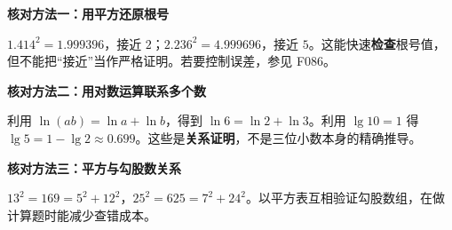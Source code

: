 \clearpage
\begin{proofbox}
\textbf{\textcolor{CProof}{核对方法一：用平方还原根号}}
\par\medskip
\begin{center}

\end{center}
\medskip
$1.414^2=1.999396$，接近 $2$；$2.236^2=4.999696$，接近 $5$。这能快速\textbf{检查}根号值，但不能把“接近”当作严格证明。若要控制误差，参见 F086。
\end{proofbox}
\clearpage
\begin{proofbox}
\textbf{\textcolor{CProof}{核对方法二：用对数运算联系多个数}}
\par\medskip
\begin{center}

\end{center}
\medskip
利用 $\ln(ab)=\ln a+\ln b$，得到 $\ln6=\ln2+\ln3$。利用 $\lg10=1$ 得 $\lg5=1-\lg2\approx0.699$。这些是\textbf{关系证明}，不是三位小数本身的精确推导。
\end{proofbox}
\clearpage
\begin{proofbox}
\textbf{\textcolor{CProof}{核对方法三：平方与勾股数关系}}
\par\medskip
\begin{center}

\end{center}
\medskip
$13^2=169=5^2+12^2$，$25^2=625=7^2+24^2$。以平方表互相验证勾股数组，在做计算题时能减少查错成本。
\end{proofbox}
